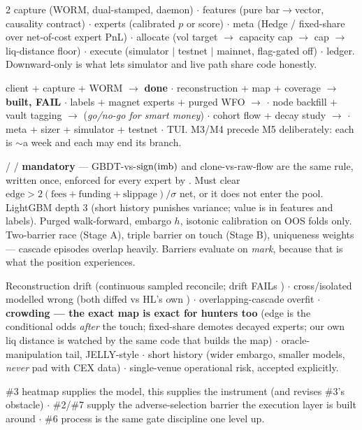 \documentclass[10pt,a4paper]{article}
\begin{document}
\begin{multicols}{2}
 capture (WORM, dual-stamped, daemon) $\cdot$  features (pure bar$\to$vector, causality
contract) $\cdot$  experts (calibrated $p$ or score) $\cdot$  meta (Hedge / fixed-share
over net-of-cost expert PnL) $\cdot$  allocate (vol target $\to$ capacity cap $\to$
 cap $\to$ liq-distance floor) $\cdot$  execute (simulator $|$ testnet $|$
mainnet, flag-gated off) $\cdot$  ledger. Downward-only is what lets simulator and live path share
code honestly.

 client + capture + WORM $\to$  \textbf{done} $\cdot$  reconstruction +
map + coverage $\to$  \textbf{built, FAIL} $\cdot$  labels + magnet experts +
purged WFO $\to$  $\cdot$  node backfill + vault tagging $\to$
 (\emph{go/no-go for smart money}) $\cdot$  cohort flow + decay study $\to$
 $\cdot$  meta + sizer + simulator + testnet $\cdot$  TUI.
M3/M4 precede M5 deliberately: each is $\sim$a week and each may end its branch.

 /  / \textbf{ mandatory} — GBDT-vs-$\operatorname{sign}(\mathrm{imb})$ and
clone-vs-raw-flow are the same rule, written once, enforced for every expert by . Must
clear $\text{edge} > 2(\text{fees}+\text{funding}+\text{slippage})/\sigma$ net, or it does not enter the
pool. LightGBM depth 3 (short history punishes variance; value is in features and labels). Purged
walk-forward, embargo $h$, isotonic calibration on OOS folds only. Two-barrier race (Stage A), triple
barrier on touch (Stage B), uniqueness weights — cascade episodes overlap heavily. Barriers evaluate on
\emph{mark}, because that is what the position experiences.

Reconstruction drift (continuous sampled reconcile; drift \textsf{FAIL}s ) $\cdot$
cross/isolated modelled wrong (both diffed vs HL's own ) $\cdot$ overlapping-cascade
overfit $\cdot$ \textbf{crowding — the exact map is exact for hunters too} (edge is the conditional odds
\emph{after} the touch; fixed-share demotes decayed experts; our own liq distance is watched by the same
code that builds the map) $\cdot$ oracle-manipulation tail, JELLY-style $\cdot$ short history (wider
embargo, smaller models, \emph{never} pad with CEX data) $\cdot$ single-venue operational risk, accepted
explicitly.

\#3 heatmap supplies the model, this supplies the instrument (and revises \#3's obstacle) $\cdot$ \#2/\#7
supply the adverse-selection barrier the execution layer is built around $\cdot$ \#6 process is the same
gate discipline one level up.

\end{multicols}

\end{document}
